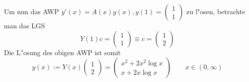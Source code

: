 {  Um nun das AWP $y'(x)=A(x)y(x),y(1)=\begin{pmatrix}1\\1\end{pmatrix}$
  zu l"osen, betrachte man das LGS
  \[Y(1)c=\begin{pmatrix}1\\1\end{pmatrix}
    \equiv c=\begin{pmatrix}1\\2\end{pmatrix}
    \]
  Die L"osung des obigen AWP ist somit
  \[y(x):=Y(x)\begin{pmatrix}1\\2\end{pmatrix}=
    \begin{pmatrix}
      x^2+2x^2\log x\\ 
      x+2x\log x
      \end{pmatrix}
    \qquad x\in(0,\infty)
    \]
  }
